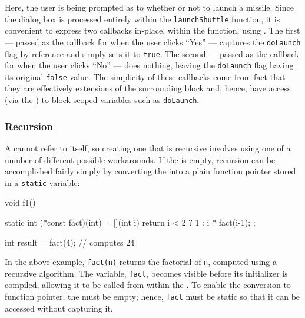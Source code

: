 \noindent Here, the user is being prompted as to whether or not to launch a
missile. Since the dialog box is processed entirely within the
\lstinline!launchShuttle! function, it is convenient to express two
callbacks in-place, within the function, using . The first  --- passed as the
callback for when the user clicks ``Yes'' --- captures the
\lstinline!doLaunch! flag by reference and simply sets it to \lstinline!true!.
The second  --- passed as the callback for
when the user clicks ``No'' --- does nothing, leaving the
\lstinline!doLaunch! flag having its original \lstinline!false! value. The
simplicity of these callbacks come from fact that they are effectively
extensions of the surrounding block and, hence, have access (via the
) to block-scoped variables such as
\lstinline!doLaunch!.

\subsubsection[Recursion]{Recursion}\label{recursion}

A  cannot refer to itself, so creating one
that is recursive involves using one of a number of different possible
workarounds. If the  is empty, recursion can be
accomplished fairly simply by converting the 
into a plain function pointer stored in a \lstinline!static! variable:

\begin{emcppslisting}
void f1()
{
    static int (*const fact)(int) = [](int i)
    {
        return i < 2 ? 1 : i * fact(i-1);
    };

    int result = fact(4);  // computes 24
}
\end{emcppslisting}
    

\noindent In the above example, \lstinline!fact(n)! returns the factorial of
\lstinline!n!, computed using a recursive algorithm. The variable,
\lstinline!fact!, becomes visible before its initializer is compiled,
allowing it to be called from within the . To
enable the conversion to function pointer, the 
must be empty; hence, \lstinline!fact! must be static so that it can be
accessed without capturing it.

